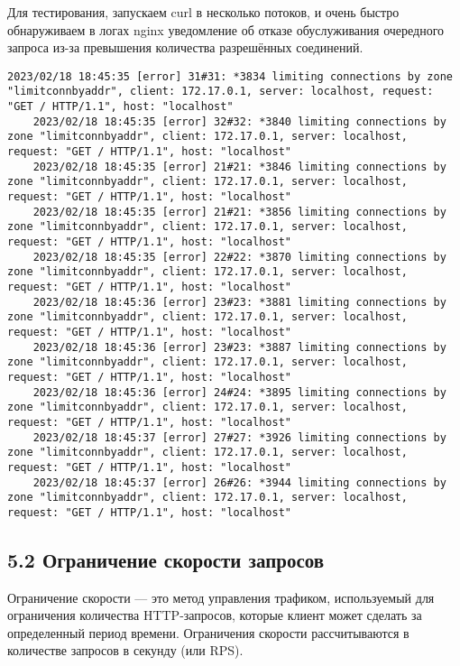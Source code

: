 Для тестирования, запускаем curl в несколько потоков, и очень быстро обнаруживаем в логах nginx уведомление об отказе обуслуживания очередного запроса из-за превышения количества разрешённых соединений.
\begin{lstlisting}[style=CommandLineStyle]
    2023/02/18 18:45:35 [error] 31#31: *3834 limiting connections by zone "limitconnbyaddr", client: 172.17.0.1, server: localhost, request: "GET / HTTP/1.1", host: "localhost"
    2023/02/18 18:45:35 [error] 32#32: *3840 limiting connections by zone "limitconnbyaddr", client: 172.17.0.1, server: localhost, request: "GET / HTTP/1.1", host: "localhost"
    2023/02/18 18:45:35 [error] 21#21: *3846 limiting connections by zone "limitconnbyaddr", client: 172.17.0.1, server: localhost, request: "GET / HTTP/1.1", host: "localhost"
    2023/02/18 18:45:35 [error] 21#21: *3856 limiting connections by zone "limitconnbyaddr", client: 172.17.0.1, server: localhost, request: "GET / HTTP/1.1", host: "localhost"
    2023/02/18 18:45:35 [error] 22#22: *3870 limiting connections by zone "limitconnbyaddr", client: 172.17.0.1, server: localhost, request: "GET / HTTP/1.1", host: "localhost"
    2023/02/18 18:45:36 [error] 23#23: *3881 limiting connections by zone "limitconnbyaddr", client: 172.17.0.1, server: localhost, request: "GET / HTTP/1.1", host: "localhost"
    2023/02/18 18:45:36 [error] 23#23: *3887 limiting connections by zone "limitconnbyaddr", client: 172.17.0.1, server: localhost, request: "GET / HTTP/1.1", host: "localhost"
    2023/02/18 18:45:36 [error] 24#24: *3895 limiting connections by zone "limitconnbyaddr", client: 172.17.0.1, server: localhost, request: "GET / HTTP/1.1", host: "localhost"
    2023/02/18 18:45:37 [error] 27#27: *3926 limiting connections by zone "limitconnbyaddr", client: 172.17.0.1, server: localhost, request: "GET / HTTP/1.1", host: "localhost"
    2023/02/18 18:45:37 [error] 26#26: *3944 limiting connections by zone "limitconnbyaddr", client: 172.17.0.1, server: localhost, request: "GET / HTTP/1.1", host: "localhost"
\end{lstlisting}

\subsection*{5.2 Ограничение скорости запросов}

Ограничение скорости — это метод управления трафиком, используемый для ограничения количества HTTP-запросов, которые клиент может сделать за определенный период времени. Ограничения скорости рассчитываются в количестве запросов в секунду (или RPS).

